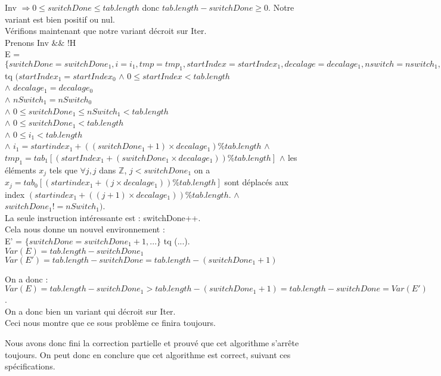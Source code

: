 Inv $\Rightarrow 0 \leq switchDone \leq tab.length$ donc $tab.length - switchDone \geq 0$. Notre variant est bien positif ou nul.\\ 

Vérifions maintenant que notre variant décroit sur Iter.\\

Prenons Inv $\&\&$ !H \\

E = $\{ switchDone = switchDone_{1}, i = i_{1}, tmp = tmp_{1}, startIndex = startIndex_{1}, decalage = decalage_{1}, nswitch = nswitch_{1}, tab = tab_{1}\}$\\
tq $(startIndex_{1} = startIndex_{0}$
$\wedge$ $0 \leq startIndex < tab.length$\\
$\wedge$ $decalage_{1} = decalage_{0}$\\
$\wedge$ $nSwitch_{1} = nSwitch_{0}$\\
$\wedge$ $0 \leq switchDone_{1} \leq nSwitch_{1} < tab.length$\\ 
$\wedge$ $0 \leq switchDone_{1} < tab.length$\\
$\wedge$ $0 \leq i_{1} < tab.length$\\
$\wedge$ $i_{1} = startindex_{1} + ((switchDone_{1}+1)\times decalage_{1}) \% tab.length$
$\wedge$ $tmp_{1} = tab_{1}[(startIndex_{1} + (switchDone_{1}\times decalage_{1})) \% tab.length]$
$\wedge$ les éléments $x_{j}$ tels que $\forall j, j$ dans $\mathbb{Z}$, $j<switchDone_{1}$ on a $x_{j}=tab_{0}[(startindex_{1} + (j\times decalage_{1})) \% tab.length]$ sont déplacés aux index $(startindex_{1} + ((j+1)\times decalage_{1})) \% tab.length$.
$\wedge$ $switchDone_{1} != nSwitch_{1})$.\\

La seule instruction intéressante est : switchDone++.\\
Cela nous donne un nouvel environnement :\\

E' = $\{switchDone = switchDone_{1}+1, ...\}$ tq (...).\\

$Var(E) = tab.length - switchDone_{1}$
$Var(E') = tab.length - switchDone = tab.length - (switchDone_{1}+1)$

On a donc : $Var(E) = tab.length - switchDone_{1} > tab.length - (switchDone_1 +1) = tab.length - switchDone = Var(E')$.\\

On a donc bien un variant qui décroit sur Iter.\\

Ceci nous montre que ce sous problème ce finira toujours. 

Nous avons donc fini la correction partielle et prouvé que cet algorithme s'arrête toujours. On peut donc en conclure que cet algorithme est correct, suivant ces spécifications. \\




